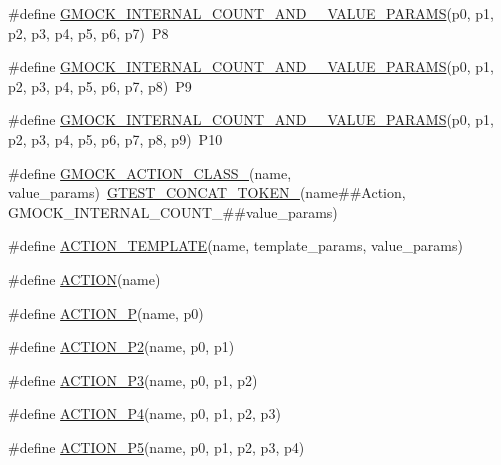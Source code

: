 \begin{DoxyCompactItemize}
\item 
\#define \hyperlink{gmock-generated-actions_8h_a461b026c9cc310c199ab1f0b59111e5a}{G\+M\+O\+C\+K\+\_\+\+I\+N\+T\+E\+R\+N\+A\+L\+\_\+\+C\+O\+U\+N\+T\+\_\+\+A\+N\+D\+\_\+\_\+\+V\+A\+L\+U\+E\+\_\+\+P\+A\+R\+A\+MS}(p0,  p1,  p2,  p3,  p4,  p5,  p6,  p7)~P8
\item 
\#define \hyperlink{gmock-generated-actions_8h_a425b81bf1cdf7cd14d1e0184df9f204f}{G\+M\+O\+C\+K\+\_\+\+I\+N\+T\+E\+R\+N\+A\+L\+\_\+\+C\+O\+U\+N\+T\+\_\+\+A\+N\+D\+\_\+\_\+\+V\+A\+L\+U\+E\+\_\+\+P\+A\+R\+A\+MS}(p0,  p1,  p2,  p3,  p4,  p5,  p6,  p7,  p8)~P9
\item 
\#define \hyperlink{gmock-generated-actions_8h_abfe1adfe26341b5270a8d3385035c464}{G\+M\+O\+C\+K\+\_\+\+I\+N\+T\+E\+R\+N\+A\+L\+\_\+\+C\+O\+U\+N\+T\+\_\+\+A\+N\+D\+\_\+\_\+\+V\+A\+L\+U\+E\+\_\+\+P\+A\+R\+A\+MS}(p0,  p1,  p2,  p3,  p4,  p5,  p6,  p7,  p8,  p9)~P10
\item 
\#define \hyperlink{gmock-generated-actions_8h_af1442d2b3f80b5d04b409bca938fdcc5}{G\+M\+O\+C\+K\+\_\+\+A\+C\+T\+I\+O\+N\+\_\+\+C\+L\+A\+S\+S\+\_\+}(name,  value\+\_\+params)~\hyperlink{gtest-internal_8h_ae3c336cbe1ae2bd1b1d019333e4428a0}{G\+T\+E\+S\+T\+\_\+\+C\+O\+N\+C\+A\+T\+\_\+\+T\+O\+K\+E\+N\+\_\+}(name\#\#Action, G\+M\+O\+C\+K\+\_\+\+I\+N\+T\+E\+R\+N\+A\+L\+\_\+\+C\+O\+U\+N\+T\+\_\+\#\#value\+\_\+params)
\item 
\#define \hyperlink{gmock-generated-actions_8h_ad04fa741f313f0c23924d61fcfb1536d}{A\+C\+T\+I\+O\+N\+\_\+\+T\+E\+M\+P\+L\+A\+TE}(name,  template\+\_\+params,  value\+\_\+params)
\item 
\#define \hyperlink{gmock-generated-actions_8h_a7af7137aa4871df4235881af377205fe}{A\+C\+T\+I\+ON}(name)
\item 
\#define \hyperlink{gmock-generated-actions_8h_a8ee9766f611f068271ca37a90c0e5960}{A\+C\+T\+I\+O\+N\+\_\+P}(name,  p0)
\item 
\#define \hyperlink{gmock-generated-actions_8h_a69fbf9ae696cc4cf779e22cb0960a067}{A\+C\+T\+I\+O\+N\+\_\+\+P2}(name,  p0,  p1)
\item 
\#define \hyperlink{gmock-generated-actions_8h_ab038de3f66ae709773473c18b6a43b29}{A\+C\+T\+I\+O\+N\+\_\+\+P3}(name,  p0,  p1,  p2)
\item 
\#define \hyperlink{gmock-generated-actions_8h_af416cf9b0288fce8b2c4b71e4df6cfc0}{A\+C\+T\+I\+O\+N\+\_\+\+P4}(name,  p0,  p1,  p2,  p3)
\item 
\#define \hyperlink{gmock-generated-actions_8h_ad0bb4c20795e7efe55b9b76f334554b2}{A\+C\+T\+I\+O\+N\+\_\+\+P5}(name,  p0,  p1,  p2,  p3,  p4)

\end{DoxyCompactItemize}
